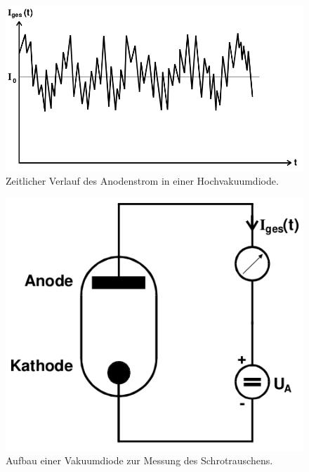 \begin{figure}[!htpb]
  \centering
  \includegraphics[scale=0.3]{bilder/diodenstrom.png}
  \caption{Zeitlicher Verlauf des Anodenstrom in einer Hochvakuumdiode.}
\label{fig:diodenstrom}
\end{figure}

\begin{figure}[!htpb]
  \centering
  \includegraphics[scale=0.3]{bilder/diode.png}
  \caption{Aufbau einer Vakuumdiode zur Messung des Schrotrauschens.}
\label{fig:diode}
\end{figure}

